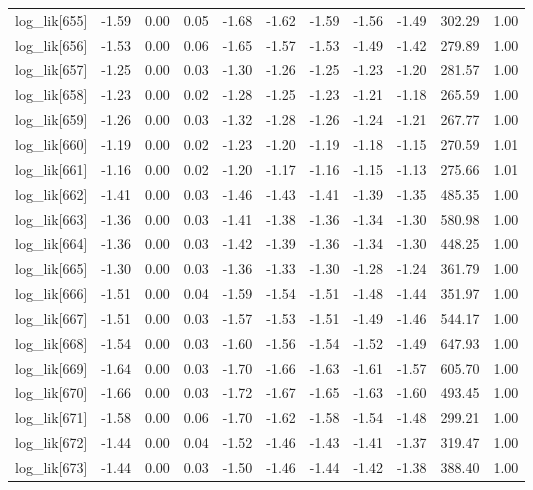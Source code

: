 \begin{table}[ht]
\begin{tabular}{rrrrrrrrrrr}
  log\_lik[655] & -1.59 & 0.00 & 0.05 & -1.68 & -1.62 & -1.59 & -1.56 & -1.49 & 302.29 & 1.00 \\ 
  log\_lik[656] & -1.53 & 0.00 & 0.06 & -1.65 & -1.57 & -1.53 & -1.49 & -1.42 & 279.89 & 1.00 \\ 
  log\_lik[657] & -1.25 & 0.00 & 0.03 & -1.30 & -1.26 & -1.25 & -1.23 & -1.20 & 281.57 & 1.00 \\ 
  log\_lik[658] & -1.23 & 0.00 & 0.02 & -1.28 & -1.25 & -1.23 & -1.21 & -1.18 & 265.59 & 1.00 \\ 
  log\_lik[659] & -1.26 & 0.00 & 0.03 & -1.32 & -1.28 & -1.26 & -1.24 & -1.21 & 267.77 & 1.00 \\ 
  log\_lik[660] & -1.19 & 0.00 & 0.02 & -1.23 & -1.20 & -1.19 & -1.18 & -1.15 & 270.59 & 1.01 \\ 
  log\_lik[661] & -1.16 & 0.00 & 0.02 & -1.20 & -1.17 & -1.16 & -1.15 & -1.13 & 275.66 & 1.01 \\ 
  log\_lik[662] & -1.41 & 0.00 & 0.03 & -1.46 & -1.43 & -1.41 & -1.39 & -1.35 & 485.35 & 1.00 \\ 
  log\_lik[663] & -1.36 & 0.00 & 0.03 & -1.41 & -1.38 & -1.36 & -1.34 & -1.30 & 580.98 & 1.00 \\ 
  log\_lik[664] & -1.36 & 0.00 & 0.03 & -1.42 & -1.39 & -1.36 & -1.34 & -1.30 & 448.25 & 1.00 \\ 
  log\_lik[665] & -1.30 & 0.00 & 0.03 & -1.36 & -1.33 & -1.30 & -1.28 & -1.24 & 361.79 & 1.00 \\ 
  log\_lik[666] & -1.51 & 0.00 & 0.04 & -1.59 & -1.54 & -1.51 & -1.48 & -1.44 & 351.97 & 1.00 \\ 
  log\_lik[667] & -1.51 & 0.00 & 0.03 & -1.57 & -1.53 & -1.51 & -1.49 & -1.46 & 544.17 & 1.00 \\ 
  log\_lik[668] & -1.54 & 0.00 & 0.03 & -1.60 & -1.56 & -1.54 & -1.52 & -1.49 & 647.93 & 1.00 \\ 
  log\_lik[669] & -1.64 & 0.00 & 0.03 & -1.70 & -1.66 & -1.63 & -1.61 & -1.57 & 605.70 & 1.00 \\ 
  log\_lik[670] & -1.66 & 0.00 & 0.03 & -1.72 & -1.67 & -1.65 & -1.63 & -1.60 & 493.45 & 1.00 \\ 
  log\_lik[671] & -1.58 & 0.00 & 0.06 & -1.70 & -1.62 & -1.58 & -1.54 & -1.48 & 299.21 & 1.00 \\ 
  log\_lik[672] & -1.44 & 0.00 & 0.04 & -1.52 & -1.46 & -1.43 & -1.41 & -1.37 & 319.47 & 1.00 \\ 
  log\_lik[673] & -1.44 & 0.00 & 0.03 & -1.50 & -1.46 & -1.44 & -1.42 & -1.38 & 388.40 & 1.00 \\ 

\end{tabular}
\end{table}
